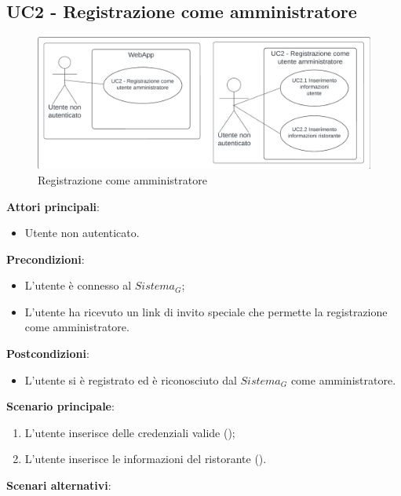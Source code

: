 \subsection{UC2 - Registrazione come amministratore}\label{usecase:2}

\begin{figure}[H]
    \centering
    \includegraphics[width=\linewidth]{ucd/UCD2_approfondito.png}
\caption{Registrazione come amministratore}
\end{figure}

\textbf{Attori principali}: 
\begin{itemize}
    \item Utente non autenticato.
\end{itemize}
\textbf{Precondizioni}:
\begin{itemize}
    \item L'utente è connesso al $\textit{Sistema}_G$;
    \item L'utente ha ricevuto un link di invito speciale che permette la registrazione come amministratore.
\end{itemize}
\textbf{Postcondizioni}: 
\begin{itemize}
    \item L'utente si è registrato ed è riconosciuto dal $\textit{Sistema}_G$ come amministratore.
\end{itemize}
\textbf{Scenario principale}:
\begin{enumerate}
    \item L'utente inserisce delle credenziali valide ();
    \item L'utente inserisce le informazioni del ristorante ().
\end{enumerate}
\textbf{Scenari alternativi}:

